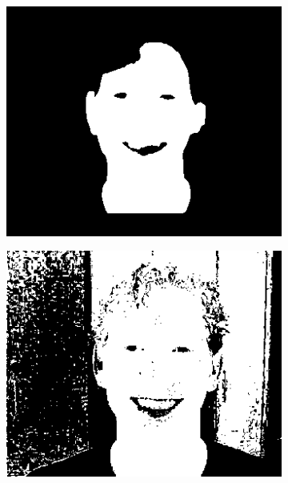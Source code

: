 \begin{figure}[h]
    \hfill
     \begin{subfigure}[b]{0.18\textwidth}
         \centering
         \includegraphics[width=\textwidth]{images/results/base/im00060_skinny_1311.png}
     \end{subfigure}
    \hfill
     \begin{subfigure}[b]{0.18\textwidth}
         \centering
         \includegraphics[width=\textwidth]{images/results/base/im00060_bayes_base_ecu.png}
     \end{subfigure}
    \hfill
     \begin{subfigure}[b]{0.18\textwidth}

\end{subfigure}
\end{figure}
